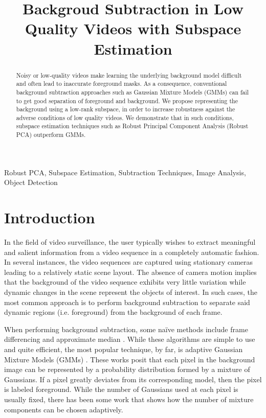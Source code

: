 \documentclass{article}
\title{Backgroud Subtraction in Low Quality Videos with Subspace Estimation}
\begin{document}
%
\maketitle
%
\begin{abstract}
Noisy or low-quality videos make learning the underlying background model difficult and often lead to inaccurate foreground masks.  As a consequence, conventional background subtraction approaches such as Gaussian Mixture Models (GMMs) can fail to get good separation of foreground and background.  We propose representing the background using a low-rank subspace, in order to increase robustness against the adverse conditions of low quality videos.  We demonstrate that in such conditions, subspace estimation techniques such as Robust Principal Component Analysis (Robust PCA) outperform GMMs.
\end{abstract}
%
\begin{keywords}
Robust PCA, Subspace Estimation,  Subtraction Techniques, Image Analysis, Object Detection
\end{keywords}
%

\vspace{0.1in}

\section{Introduction}
In the field of video surveillance, the user typically wishes to extract meaningful and salient information from a video sequence in a completely automatic fashion. In several instances, the video sequences are captured using stationary cameras leading to a relatively static scene layout. The absence of camera motion implies that the background of the video sequence exhibits very little variation while dynamic changes in the scene represent the objects of interest. In such cases, the most common approach is to perform background subtraction to separate said dynamic regions (i.e. foreground) from the background of each frame.

When performing background subtraction, some na\"ive methods include frame differencing and approximate median \cite{approxMed}. %
While these algorithms are simple to use and quite efficient, the most popular technique, by far, is adaptive  Gaussian Mixture Models (GMMs) \cite{FriedmanGMM, StaufferGMM}. These works posit that each pixel in the background image can be represented by a probability distribution formed by a mixture of Gaussians. If a pixel greatly deviates from its corresponding model, then the pixel is labeled foreground. While the number of Gaussians used at each pixel is usually fixed, there has been some work \cite{ZivGMM} that shows how the number of mixture components can be chosen adaptively.
\end{document}
